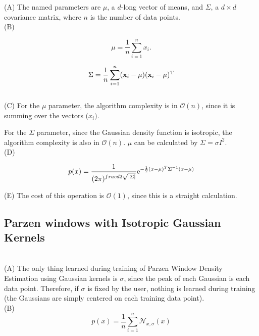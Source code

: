 \documentclass{amsart}
\theoremstyle{definition}
\theoremstyle{remark}
\numberwithin{equation}{section}
\begin{document}
(A) The named parameters are $\mu$, a $d$-long vector of means, and $\Sigma$, a $d \times d$ covariance matrix, where $n$ is the number of data points. \\

(B) 

\begin{equation}
    \mu = \frac{1}{n}\sum_{i=1}^{n}x_{i}.
\end{equation}

\begin{equation}
    \Sigma = {1 \over {n}}\sum_{i=1}^n (\mathbf{x}_i-\mu) (\mathbf{x}_i-\mu)^\mathrm{T}
\end{equation} \\

(C) For the $\mathcal{\mu}$ parameter, the algorithm complexity is in $\mathcal{O}(n)$, since it is summing over the vectors $\mathcal (x_{i})$.

For the  $\Sigma$ parameter, since the Gaussian density function is isotropic, the algorithm complexity is also in $\mathcal{O}(n)$. $\mu$ can be calculated by $\Sigma = \sigma I^2$. \\

(D)

\begin{equation}
    p(x) = \frac{1}{(2\pi)^{frac{d}{2} \sqrt{|\Sigma|}}} {\rm e}^{-\frac{1}{2}(x-\mu)^T \Sigma^{-1} (x-\mu)}   
\end{equation}
 
(E) The cost of this operation is $\mathcal{O}(1)$, since this is a straight calculation. \\

\subsection{Parzen windows with Isotropic Gaussian Kernels} \\

(A) The only thing learned during training of Parzen Window Density Estimation using Gaussian kernels is $\sigma$, since the peak of each Gaussian is each data point. Therefore, if $\sigma$ is fixed by the user, nothing is learned during training (the Gaussians are simply centered on each training data point). \\

(B) \\

\begin{equation}
    p(x) = \frac{1}{n}\sum_{i=1}^{n}\mathcal{N}_{x, \sigma}(x)
\end{equation}
\end{document}

